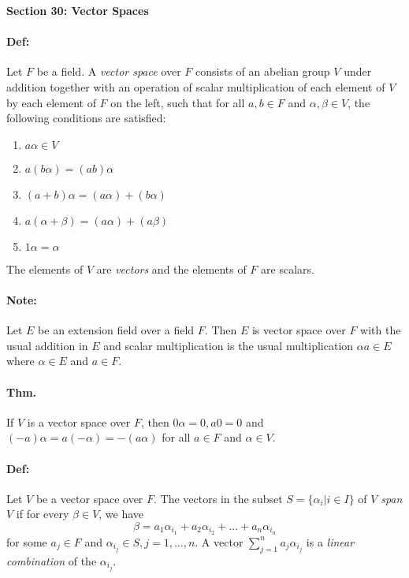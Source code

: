 \documentclass[10pt,a4paper]{article}
\begin{document}
\begin{center}
\textbf{Section 30: Vector Spaces}
\end{center}

\paragraph{Def:} Let $F$ be a field. A \textit{vector space} over $F$ consists of an abelian group $V$ under addition together with an operation of scalar multiplication of each element of $V$ by each element of $F$ on the left, such that for all $a,b \in F$ and $\alpha, \beta \in V$, the following conditions are satisfied:
\begin{enumerate}
\item $a\alpha \in V$
\item $a(b\alpha) = (ab)\alpha$
\item $(a+b)\alpha = (a\alpha)+(b\alpha)$
\item $a(\alpha + \beta) = (a\alpha) + (a\beta)$
\item $1 \alpha = \alpha$
\end{enumerate}

The elements of $V$ are \textit{vectors} and the elements of $F$ are scalars.

\paragraph{Note:} Let $E$ be an extension field over a field $F$. Then $E$ is vector space over $F$ with the usual addition in $E$ and scalar multiplication is the usual multiplication $\alpha a \in E$ where $\alpha \in E$ and $a \in F$.

\paragraph{Thm.} If $V$ is a vector space over $F$, then $0\alpha = 0, a0 =0$ and $(-a)\alpha=a(-\alpha) = -(a\alpha)$ for all $ a \in F$ and $\alpha \in V$.

\paragraph{Def:} Let $V$ be a vector space over $F$. The vectors in the subset $S = \{ \alpha_i | i\in I\}$ of $V$ \textit{span} $V$ if for every $\beta \in V$, we have 
$$ \beta = a_1\alpha_{i_1}+a_2\alpha_{i_2}+\dots + a_n\alpha_{i_n}$$
for some $a_j \in F$ and $\alpha_{i_j} \in S, j= 1, \dots, n$. A vector $\sum_{j=1}^n a_j\alpha_{i_j}$ is a \textit{linear combination} of the $\alpha_{i_j}$.
\end{document}
